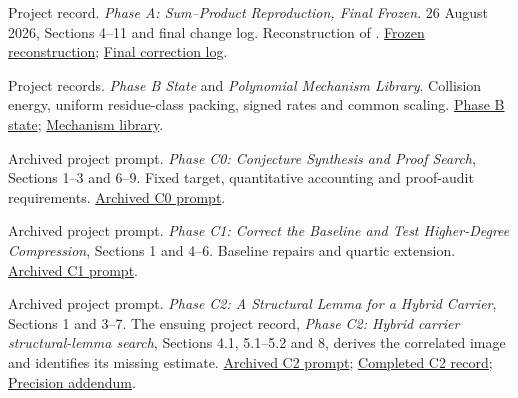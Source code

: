 
Project record. \emph{Phase A: Sum--Product Reproduction, Final Frozen}. 26 August 2026, Sections 4--11 and final change log. Reconstruction of \cite{ref3}. \href{https://github.com/hnt119/polynomial-image-compression/blob/145d0e5a6ff725ab13cbb5c696bf335352e6f4a1/research/history-sources/Phase_A_Sum_Product_Reproduction_FINAL_FROZEN.pdf}{Frozen reconstruction}; \href{https://github.com/hnt119/polynomial-image-compression/blob/145d0e5a6ff725ab13cbb5c696bf335352e6f4a1/research/history-sources/Phase_A_FINAL_FROZEN_Change_Log.pdf}{Final correction log}.

Project records. \emph{Phase B State} and \emph{Polynomial Mechanism Library}. Collision energy, uniform residue-class packing, signed rates and common scaling. \href{https://github.com/hnt119/polynomial-image-compression/blob/145d0e5a6ff725ab13cbb5c696bf335352e6f4a1/research/history-sources/PHASE_B_STATE.md}{Phase B state}; \href{https://github.com/hnt119/polynomial-image-compression/blob/145d0e5a6ff725ab13cbb5c696bf335352e6f4a1/research/history-sources/POLYNOMIAL_MECHANISM_LIBRARY.md}{Mechanism library}.

Archived project prompt. \emph{Phase C0: Conjecture Synthesis and Proof Search}, Sections 1--3 and 6--9. Fixed target, quantitative accounting and proof-audit requirements. \href{https://github.com/hnt119/polynomial-image-compression/blob/145d0e5a6ff725ab13cbb5c696bf335352e6f4a1/research/prompts/Phase_C0_Conjecture_Proof_Search_Prompt.md}{Archived C0 prompt}.

Archived project prompt. \emph{Phase C1: Correct the Baseline and Test Higher-Degree Compression}, Sections 1 and 4--6. Baseline repairs and quartic extension. \href{https://github.com/hnt119/polynomial-image-compression/blob/145d0e5a6ff725ab13cbb5c696bf335352e6f4a1/research/prompts/Phase_C1_Corrections_and_Higher_Degree_Proof_Search_Prompt.md}{Archived C1 prompt}.

Archived project prompt. \emph{Phase C2: A Structural Lemma for a Hybrid Carrier}, Sections 1 and 3--7. The ensuing project record, \emph{Phase C2: Hybrid carrier structural-lemma search}, Sections 4.1, 5.1--5.2 and 8, derives the correlated image and identifies its missing estimate. \href{https://github.com/hnt119/polynomial-image-compression/blob/145d0e5a6ff725ab13cbb5c696bf335352e6f4a1/research/prompts/Phase_C2_Hybrid_Carrier_Structural_Lemma_Prompt.md}{Archived C2 prompt}; \href{https://github.com/hnt119/polynomial-image-compression/blob/145d0e5a6ff725ab13cbb5c696bf335352e6f4a1/research/report-source-supplement/c2/Phase_C2_Hybrid_Carrier_Structural_Lemma.md}{Completed C2 record}; \href{https://github.com/hnt119/polynomial-image-compression/blob/145d0e5a6ff725ab13cbb5c696bf335352e6f4a1/research/report-source-supplement/c2/C2_PRECISION_ADDENDUM.md}{Precision addendum}.

